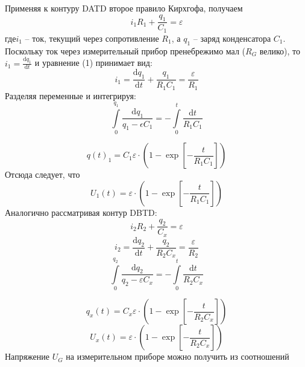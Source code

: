 \documentclass[a4paper,12pt]{extarticle}
\begin{document}
Применяя к контуру DATD второе правило Кирхгофа, получаем
\begin{equation}
i_1 R_1 + \frac{q_1}{C_1}=\varepsilon
\end{equation}
где$ i_1$ -- ток, текущий через сопротивление $R_1$, а $q_1$ -- заряд конденсатора $C_1$. 
Поскольку ток через измерительный прибор пренебрежимо мал ($R_G$ велико), то $i_1=\frac{\mathrm{d}q_1 }{\mathrm{d} t}$ и уравнение (1) принимает вид:
\begin{equation}
i_1=\frac{\mathrm{d}q_1 }{\mathrm{d} t} + \frac{q_1}{R_1 C_1}=\frac{\varepsilon}{R_1}
\end{equation}
Разделяя переменные и интегрируя:
\begin{equation}
 \int \limits^{q_1}_0 \frac{\mathrm{d} q_1}{q_1-\epsilon C_1}=-\int \limits^t_0 \frac{\mathrm{d} t}{R_1 C_1}
\end{equation}

\begin{equation}
	q(t)_1 = C_1 \varepsilon \cdot 
	\left( 
		1-
		\exp\left[		
			-\frac{t}{R_1 C_1}
		\right]
	\right)
\end{equation}
Отсюда следует, что
\begin{equation}
	U_1(t) = \varepsilon \cdot 
	\left( 
		1-
		\exp\left[		
			-\frac{t}{R_1 C_1}
		\right]
	\right)
\end{equation}
Аналогично рассматривая контур DBTD:
\begin{equation}
i_2 R_2 + \frac{q_2}{C_x}=\varepsilon
\end{equation}
\begin{equation}
i_2=\frac{\mathrm{d}q_2 }{\mathrm{d} t} + \frac{q_2}{R_2 C_x}=\frac{\varepsilon}{R_2}
\end{equation}
\begin{equation}
 \int \limits^{q_2}_0 \frac{\mathrm{d} q_2}{q_2-\varepsilon C_x}=-\int \limits^t_0 \frac{\mathrm{d} t}{R_2 C_x}
\end{equation}

\begin{equation}
q_x(t) = C_x \varepsilon \cdot 
\left( 
	1-
	\exp\left[		
		-\frac{t}{R_2 C_x}
	\right]
\right)
\end{equation}
\begin{equation}
U_x(t) =  \varepsilon \cdot 
\left( 
	1- 
	\exp\left[
	{-\frac{t}{R_2 C_x}}
	\right]
\right)
\end{equation}
Напряжение $U_G$ на измерительном приборе можно получить из соотношений
\end{document}

